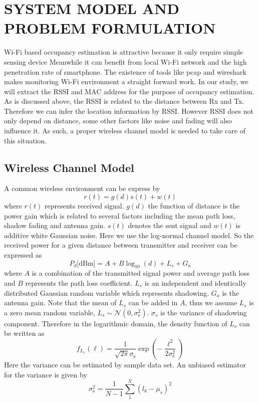 \chapter{SYSTEM MODEL AND PROBLEM FORMULATION}
Wi-Fi based occupancy estimation is attractive because it only require simple sensing device Meanwhile it can benefit from local Wi-Fi network and the high penetration rate of smartphone. The existence of tools like pcap and wireshark makes monitoring Wi-Fi environment a straight forward work. In our study, we will extract the RSSI and MAC address for the purpose of occupancy estimation. As is discussed above, the RSSI is related to the distance between Rx and Tx. Therefore we can infer the location information by RSSI. However RSSI does not only depend on distance, some other factors like noise and fading will also influence it. As such, a proper wireless channel model is needed to take care of this situation.
\section{Wireless Channel Model}
A common wireless environment can be express by
\begin{equation*}
r (t) = g (d) s (t) + w (t)
\end{equation*}
where $r (t)$ represents received signal. $g (d)$ the function of distance is the power gain which is related to several factors including the mean path loss, shadow fading and antenna gain. $s (t)$ denotes the sent signal and $w (t)$ is additive white Gaussian noise.
Here we use the log-normal channel model. So the received power for a given distance between transmitter and receiver can be expressed as
\begin{equation}
P_{d} \text{[dBm]}
= A + B \log_{10}(d) + L_{s} + G_{a} 
\end{equation}
where $A$ is a combination of the transmitted signal power and average path loss
and $B$ represents the path loss coefficient.
$L_{s}$ is an independent and identically distributed Gaussian random variable which represents shadowing.
$G_{a}$ is the antenna gain. Note that the mean of $L_{s}$ can be added in $A$, thus we assume $L_{s}$ is a zero mean random variable, $L_{s}\sim\mathcal{N}(0,\sigma_{\mathrm{s}}^2)$. $\sigma_{s}$ is the variance of shadowing component. Therefore in the logarithmic domain, the density function of $L_{s}$ can be written as
\begin{equation*}
f_{L_{s}} (\ell)
= \frac{1}{\sqrt{2 \pi} \sigma_{\mathrm{s}}} 
\exp \left( - \frac{\ell^2}{2 \sigma_{\mathrm{s}}^2} \right) 
\end{equation*}
Here the variance can be estimated by sample data set. An unbiased estimator for the variance is given by~\cite{zwillinger1995crc}
\begin{equation*}
\sigma_{\mathrm{s}}^2 = \frac{1}{N-1} \sum_{1}^{N} (l_{k}-\mu_{s})^2
\end{equation*} 

